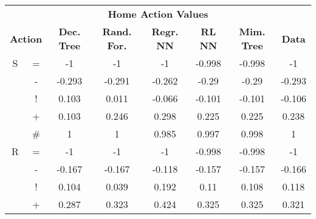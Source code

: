 \documentclass{sfuthesis}
\begin{document}
	\begin{table}
		\centering
		\begin{tabular}{cccccccc}
			\multicolumn{8}{c}{\textbf{Home Action Values}}                                                                                                                                                  \\
			\multicolumn{2}{c|}{\textbf{Action}} & \textbf{Dec. Tree} & \textbf{Rand. For.} & \textbf{Regr. NN} & \textbf{RL NN} & \multicolumn{1}{c|}{\textbf{Mim. Tree}} & \textbf{Data} \\ \hline
			S              & \multicolumn{1}{c|}{=}                & -1                 & -1                  & -1                & -0.998         & \multicolumn{1}{c|}{-0.998}             & -1            \\
			& \multicolumn{1}{c|}{-}                & -0.293             & -0.291              & -0.262            & -0.29          & \multicolumn{1}{c|}{-0.29}              & -0.293        \\
			& \multicolumn{1}{c|}{!}                & 0.103              & 0.011               & -0.066            & -0.101         & \multicolumn{1}{c|}{-0.101}             & -0.106        \\
			& \multicolumn{1}{c|}{+}                & 0.103              & 0.246               & 0.298             & 0.225          & \multicolumn{1}{c|}{0.225}              & 0.238         \\
			& \multicolumn{1}{c|}{\#}               & 1                  & 1                   & 0.985             & 0.997          & \multicolumn{1}{c|}{0.998}              & 1             \\ \hline
			R              & \multicolumn{1}{c|}{=}                & -1                 & -1                  & -1                & -0.998         & \multicolumn{1}{c|}{-0.998}             & -1            \\
			& \multicolumn{1}{c|}{-}                & -0.167             & -0.167              & -0.118            & -0.157         & \multicolumn{1}{c|}{-0.157}             & -0.166        \\
			& \multicolumn{1}{c|}{!}                & 0.104              & 0.039               & 0.192             & 0.11           & \multicolumn{1}{c|}{0.108}              & 0.118         \\
			& \multicolumn{1}{c|}{+}                & 0.287              & 0.323               & 0.424             & 0.325          & \multicolumn{1}{c|}{0.325}              & 0.321         \\

\end{tabular}
\end{table}
\end{document}
